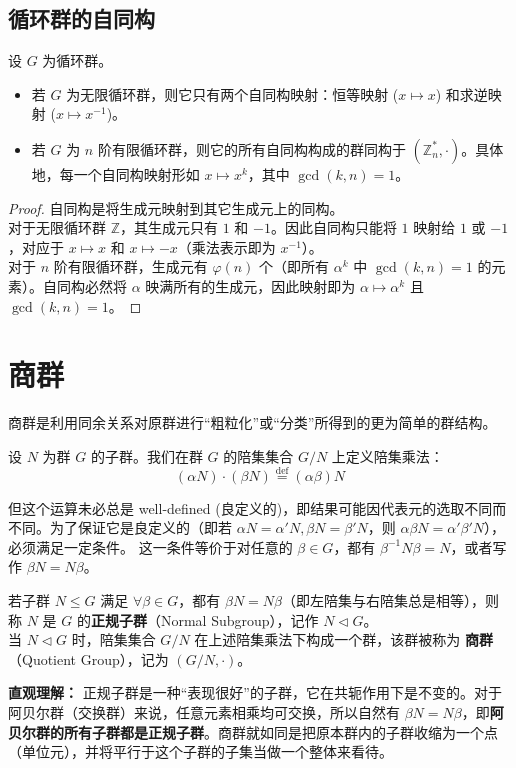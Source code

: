 \documentclass[11pt]{article}
\begin{document}
\subsection{循环群的自同构}

\begin{cntheorem}[循环群的自同构]
设 $G$ 为循环群。
\begin{itemize}
    \item 若 $G$ 为无限循环群，则它只有两个自同构映射：恒等映射 ($x \mapsto x$) 和求逆映射 ($x \mapsto x^{-1}$)。
    \item 若 $G$ 为 $n$ 阶有限循环群，则它的所有自同构构成的群同构于 $(\mathbb{Z}_n^*, \cdot)$。具体地，每一个自同构映射形如 $x \mapsto x^k$，其中 $\gcd(k, n) = 1$。
\end{itemize}
\end{cntheorem}
\begin{proof}
自同构是将生成元映射到其它生成元上的同构。\\
对于无限循环群 $\mathbb{Z}$，其生成元只有 $1$ 和 $-1$。因此自同构只能将 $1$ 映射给 $1$ 或 $-1$，对应于 $x \mapsto x$ 和 $x \mapsto -x$（乘法表示即为 $x^{-1}$）。\\
对于 $n$ 阶有限循环群，生成元有 $\varphi(n)$ 个（即所有 $\alpha^k$ 中 $\gcd(k, n) = 1$ 的元素）。自同构必然将 $\alpha$ 映满所有的生成元，因此映射即为 $\alpha \mapsto \alpha^k$ 且 $\gcd(k, n) = 1$。
\end{proof}

\section{商群}

商群是利用同余关系对原群进行“粗粒化”或“分类”所得到的更为简单的群结构。

\begin{cndefinition}[商集与陪集乘法]
设 $N$ 为群 $G$ 的子群。我们在群 $G$ 的陪集集合 $G/N$ 上定义陪集乘法：
$$ (\alpha N) \cdot (\beta N) \overset{\mathrm{def}}{=} (\alpha \beta) N $$
\end{cndefinition}

但这个运算未必总是 well-defined (良定义的)，即结果可能因代表元的选取不同而不同。为了保证它是良定义的（即若 $\alpha N = \alpha' N, \beta N = \beta' N$，则 $\alpha\beta N = \alpha'\beta' N$），必须满足一定条件。
这一条件等价于对任意的 $\beta \in G$，都有 $\beta^{-1}N\beta = N$，或者写作 $\beta N = N \beta$。

\begin{cndefinition}[正规子群与商群]
若子群 $N \le G$ 满足 $\forall \beta \in G$，都有 $\beta N = N \beta$（即左陪集与右陪集总是相等），则称 $N$ 是 $G$ 的\textbf{正规子群}（Normal Subgroup），记作 $N \triangleleft G$。\\
当 $N \triangleleft G$ 时，陪集集合 $G/N$ 在上述陪集乘法下构成一个群，该群被称为 \textbf{商群}（Quotient Group），记为 $(G/N, \cdot)$。
\end{cndefinition}
\textbf{直观理解：} 正规子群是一种“表现很好”的子群，它在共轭作用下是不变的。对于阿贝尔群（交换群）来说，任意元素相乘均可交换，所以自然有 $\beta N = N \beta$，即\textbf{阿贝尔群的所有子群都是正规子群}。商群就如同是把原本群内的子群收缩为一个点（单位元），并将平行于这个子群的子集当做一个整体来看待。
\end{document}
